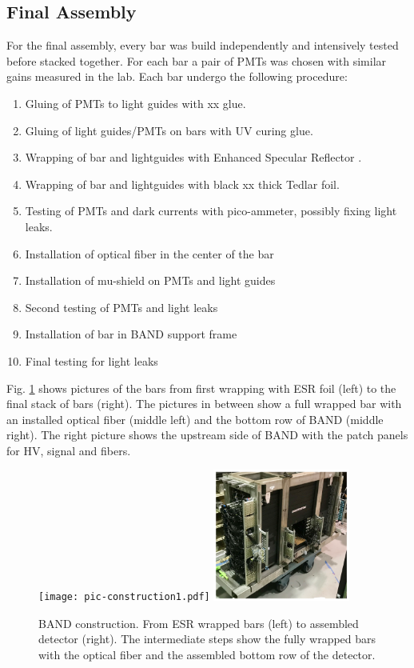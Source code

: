 \documentclass[3p,final,twocolumn]{elsarticle}
\begin{document}
\subsection{Final Assembly}
For the final assembly, every bar was build independently and intensively tested before stacked together. For each bar a pair of PMTs was chosen with similar gains measured in the lab.
Each bar undergo the following procedure:
\begin{enumerate}
\item Gluing of PMTs to light guides with xx glue.
\item Gluing of light guides/PMTs on bars with UV curing glue.
\item Wrapping of bar and lightguides with Enhanced Specular Reflector \cite{3MESR}.
\item Wrapping of bar and lightguides with black xx thick Tedlar foil.
\item Testing of PMTs and dark currents with pico-ammeter, possibly fixing light leaks.
\item Installation of optical fiber in the center of the bar
\item Installation of mu-shield on PMTs and light guides
\item Second testing of PMTs and light leaks
\item Installation of bar in BAND support frame
\item Final testing for light leaks
\end{enumerate}
Fig. \ref{fig:barassembly} shows pictures of the bars from first wrapping with ESR foil (left) to the final stack of bars (right). The pictures in between show a full wrapped bar with an installed optical fiber (middle left) and the bottom row of BAND (middle right). The right picture shows the upstream side of BAND with the patch panels for HV, signal and fibers.
\begin{figure}[tb]
	\centering
	\texttt{[image: pic-construction1.pdf]}
	\includegraphics[width=0.40\textwidth , height=0.40\textwidth]{pic-construction2.pdf}
				\caption{BAND construction. From ESR \cite{3MESR} wrapped bars (left) to assembled detector (right). The intermediate steps show the fully wrapped bars with the optical fiber and the assembled bottom row of the detector. }
		\label{fig:barassembly}
\end{figure}
\end{document}
